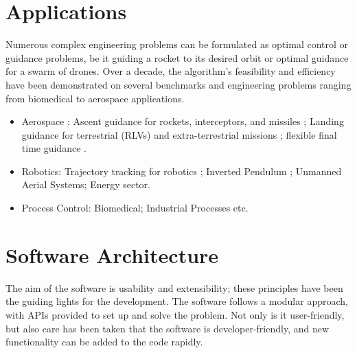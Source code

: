 \documentclass[12pt]{article}
\renewcommand{\vec}[1]{\mathbf{#1}}
\begin{document}


\section{Applications}

Numerous complex engineering problems can be formulated as optimal control or guidance problems, be it guiding a rocket to its desired orbit or optimal guidance for a swarm of drones. Over a decade, the algorithm's feasibility and efficiency have been demonstrated on several benchmarks and engineering problems ranging from biomedical to aerospace applications. 

\begin{itemize}
\item Aerospace : Ascent guidance for rockets, interceptors, and missiles \cite{padhi2009model,dwivedi2011suboptimal,mondal2018angle,oza2012impact,kothari2010nonlinear}; Landing guidance for terrestrial (RLVs) and extra-terrestrial missions \cite{chawla2010suboptimal,Sachan2019,halbe2014robust}; flexible final time guidance \cite{maity2016robust}.
\item Robotics: Trajectory tracking for robotics \cite{kumar2019model} ; Inverted Pendulum \cite{mathavaraj2019unscented}; Unmanned Aerial Systems; Energy sector.
\item Process Control: Biomedical; Industrial Processes etc.
\end{itemize}

\section{Software Architecture}

The aim of the software is usability and extensibility; these principles have been the guiding lights for the development. The software follows a modular approach, with APIs provided to set up and solve the problem. Not only is it user-friendly, but also care has been taken that the software is developer-friendly, and new functionality can be added to the code rapidly.
\end{document}
